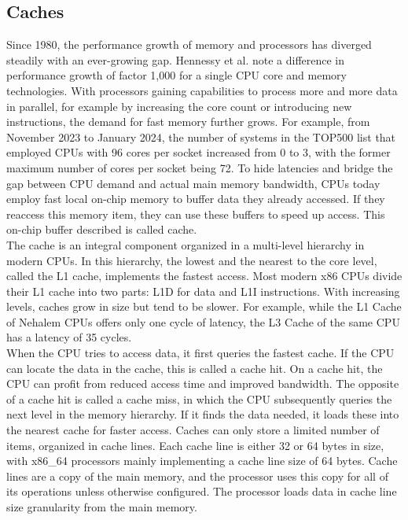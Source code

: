 \subsection{Caches}
\label{sec:state:technical:caches}
Since 1980, the performance growth of memory and processors has diverged
steadily with an ever-growing gap. Hennessy et al. note a difference in
performance growth of factor 1,000 for a single CPU core and memory
technologies.\cite{hennessy2011computer} With processors gaining capabilities to
process more and more data in parallel, for example by increasing the core count
or introducing new instructions, the demand for fast memory further grows. For
example, from November 2023 to January 2024, the number of systems in the TOP500
list that employed CPUs with 96 cores per socket increased from 0 to 3, with the
former maximum number of cores per socket being 72.\cite{top500} To hide
latencies and bridge the gap between CPU demand and actual main memory
bandwidth, CPUs today employ fast local on-chip memory to buffer data they
already accessed. If they reaccess this memory item, they can use these buffers
to speed up access. This on-chip buffer described is called cache.\\

The cache is an integral component organized in a multi-level hierarchy in
modern CPUs. In this hierarchy, the lowest and the nearest to the core level,
called the L1 cache, implements the fastest access. Most modern x86 CPUs divide
their L1 cache into two parts: L1D for data and L1I instructions. With
increasing levels, caches grow in size but tend to be slower. For example, while
the L1 Cache of Nehalem CPUs offers only one cycle of latency, the L3 Cache of
the same CPU has a latency of 35 cycles.\cite{hennessy2011computer}\\

When the CPU tries to access data, it first queries the fastest cache. If the
CPU can locate the data in the cache, this is called a cache hit. On a cache
hit, the CPU can profit from reduced access time and improved bandwidth. The
opposite of a cache hit is called a cache miss, in which the CPU subsequently
queries the next level in the memory hierarchy. If it finds the data needed, it
loads these into the nearest cache for faster access. Caches can only store a
limited number of items, organized in cache lines. Each cache line is either 32
or 64 bytes in size, with x86\_64 processors mainly implementing a cache line
size of 64 bytes. Cache lines are a copy of the main memory, and the processor
uses this copy for all of its operations unless otherwise configured. The
processor loads data in cache line size granularity from the main memory. \\

